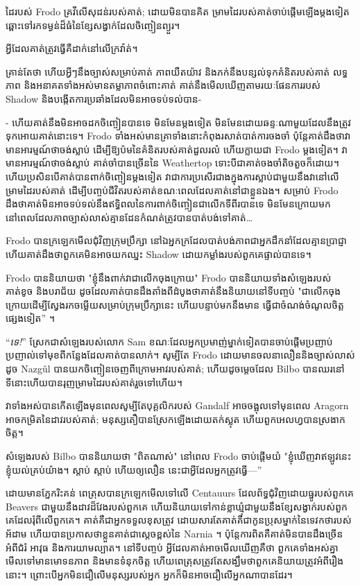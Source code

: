 ដៃរបស់ Frodo គ្រវីលើសុដន់របស់គាត់; ដោយមិនបានគិត ម្រាមដៃរបស់គាត់ចាប់ផ្តើមឡើងម្តងទៀត ឆ្ពោះទៅរកទម្ងន់ដ៏ធំនៃខ្សែសង្វាក់ដែលចិញ្ចៀនព្យួរ។

អ្វីដែលគាត់ត្រូវធ្វើគឺដាក់នៅលើក្រវ៉ាត់។

គ្រាន់តែថា ហើយអ្វីៗនឹងច្បាស់សម្រាប់គាត់ ភាពយឺតយ៉ាវ និងភក់នឹងបន្សល់ទុកគំនិតរបស់គាត់ លទ្ធភាព និងអនាគតទាំងអស់មានតម្លាភាពចំពោះគាត់ គាត់នឹងមើលឃើញតាមរយៈផែនការរបស់ Shadow និងបង្កើតការប្រឆាំងដែលមិនអាចទប់ទល់បាន-

- ហើយគាត់នឹងមិនអាចដកចិញ្ចៀនបានទេ មិនមែនម្តងទៀត មិនមែនដោយឆន្ទៈណាមួយដែលនឹងត្រូវទុកអោយគាត់នោះទេ។ Frodo ទាំងអស់មានគ្រាទាំងនោះកំពុងរសាត់បាត់ការចងចាំ ប៉ុន្តែគាត់ដឹងថាវាមានអារម្មណ៍ថាចង់ស្លាប់ ដើម្បីឱ្យប៉មនៃគំនិតរបស់គាត់ដួលរលំ ហើយក្លាយជា Frodo ម្តងទៀត។ វាមានអារម្មណ៍ថាចង់ស្លាប់ គាត់ចាំបានច្រើននៃ Weathertop ទោះបីជាគាត់ចងចាំតិចតួចក៏ដោយ។ ហើយប្រសិនបើគាត់បានពាក់ចិញ្ចៀនម្តងទៀត វាជាការប្រសើរជាងក្នុងការស្លាប់ជាមួយនឹងវានៅលើម្រាមដៃរបស់គាត់ ដើម្បីបញ្ចប់ជីវិតរបស់គាត់ខណៈពេលដែលគាត់នៅជាខ្លួនឯង។ សម្រាប់ Frodo ដឹងថាគាត់មិនអាចទប់ទល់នឹងឥទ្ធិពលនៃការពាក់ចិញ្ចៀនជាលើកទីពីរបានទេ មិនមែនក្រោយមកនៅពេលដែលភាពច្បាស់លាស់គ្មានដែនកំណត់ត្រូវបានបាត់បង់ទៅគាត់…

Frodo បានក្រឡេកមើលជុំវិញក្រុមប្រឹក្សា នៅឯអ្នកក្រដែលបាត់បង់ភាពជាអ្នកដឹកនាំដែលគ្មានប្រាជ្ញា ហើយគាត់ដឹងថាពួកគេមិនអាចយកឈ្នះ Shadow ដោយកម្លាំងរបស់ពួកគេផ្ទាល់បានទេ។

Frodo បាននិយាយថា "ខ្ញុំនឹងពាក់វាជាលើកចុងក្រោយ" Frodo បាននិយាយទាំងសំឡេងរបស់គាត់ខូច និងបរាជ័យ ដូចដែលគាត់បានដឹងតាំងពីដំបូងថាគាត់នឹងនិយាយនៅទីបញ្ចប់ "ជាលើកចុងក្រោយដើម្បីស្វែងរកចម្លើយសម្រាប់ក្រុមប្រឹក្សានេះ ហើយបន្ទាប់មកនឹងមាន ធ្វើជាចំណង់ចំណូលចិត្តផ្សេងទៀត” ។

“\emph{ទេ!}” ស្រែក​ជា​សំឡេង​របស់​លោក Sam ខណៈ​ដែល​អ្នក​ប្រមាញ់​ម្នាក់​ទៀត​បាន​ចាប់​ផ្តើម​ប្រញាប់​ប្រញាល់​ទៅ​មុខ​ពី​កន្លែង​ដែល​គាត់​បាន​លាក់។ សូម្បីតែ Frodo ដោយមានចលនាលឿននិងច្បាស់លាស់ដូច Nazgûl បានយកចិញ្ចៀនចេញពីក្រោមអាវរបស់គាត់; ហើយដូចម្ដេចដែល Bilbo បានឈរនៅទីនោះហើយបានរុញម្រាមដៃរបស់គាត់រួចទៅហើយ។

វាទាំងអស់បានកើតឡើងមុនពេលសូម្បីតែបុគ្គលិករបស់ Gandalf អាចចង្អុលទៅមុនពេល Aragorn អាចកម្រិតនៃដាវរបស់គាត់; មនុស្សតឿបានស្រែកឡើងដោយតក់ស្លុត ហើយពួកអេលហ្វបានស្រងាកចិត្ត។

សំឡេងរបស់ Bilbo បាននិយាយថា "ពិតណាស់" នៅពេល Frodo ចាប់ផ្តើមយំ "ខ្ញុំឃើញវាឥឡូវនេះ ខ្ញុំយល់គ្រប់យ៉ាង។ ស្តាប់ ស្តាប់ ហើយឲ្យលឿន នេះជាអ្វីដែលអ្នកត្រូវធ្វើ—”


ដោយមានភ្នែករិះគន់ ពេត្រុសបានក្រឡេកមើលទៅលើ Centauurs ដែលព័ទ្ធជុំវិញដោយធ្នូរបស់ពួកគេ Beavers ជាមួយនឹងដាវដ៏វែងរបស់ពួកគេ ហើយនិយាយទៅកាន់ខ្លាឃ្មុំជាមួយនឹងខ្សែសង្វាក់របស់ពួកគេដែលរុំពីលើពួកគេ។ គាត់គឺជាអ្នកទទួលខុសត្រូវ ដោយសារតែគាត់គឺជាកូនប្រុសម្នាក់នៃទេវកថារបស់អ័ដាម ហើយបានប្រកាសថាខ្លួនគាត់ជាស្តេចខ្ពស់នៃ Narnia ។ ប៉ុន្តែ​ការពិត​គឺ​គាត់​មិន​បានដឹង​ច្រើន​អំពី​ជំរំ អាវុធ និង​ការយាមល្បាត​។ នៅទីបញ្ចប់ អ្វីដែលគាត់អាចមើលឃើញគឺថា ពួកគេទាំងអស់គ្នាមើលទៅមានមោទនភាព និងមានទំនុកចិត្ត ហើយពេត្រុសត្រូវតែសង្ឃឹមថាពួកគេនិយាយត្រូវអំពីរឿងនោះ។ ព្រោះ​បើ​អ្នក​មិន​ជឿ​លើ​មនុស្ស​របស់​អ្នក អ្នក​ក៏​មិន​អាច​ជឿ​លើ​អ្នក​ណា​បាន​ដែរ។

